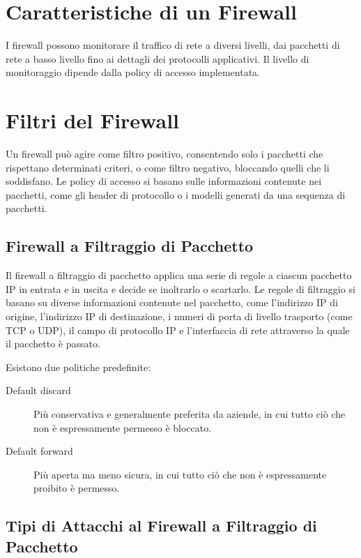 \section{Caratteristiche di un Firewall}

I firewall possono monitorare il traffico di rete a diversi livelli, dai pacchetti di rete a basso livello fino ai dettagli dei protocolli applicativi. Il livello di monitoraggio dipende dalla policy di accesso implementata.

\section{Filtri del Firewall}

Un firewall può agire come filtro positivo, consentendo solo i pacchetti che rispettano determinati criteri, o come filtro negativo, bloccando quelli che li soddisfano. Le policy di accesso si basano sulle informazioni contenute nei pacchetti, come gli header di protocollo o i modelli generati da una sequenza di pacchetti.

\subsection{Firewall a Filtraggio di Pacchetto}

Il firewall a filtraggio di pacchetto applica una serie di regole a ciascun pacchetto IP in entrata e in uscita e decide se inoltrarlo o scartarlo. Le regole di filtraggio si basano su diverse informazioni contenute nel pacchetto, come l'indirizzo IP di origine, l'indirizzo IP di destinazione, i numeri di porta di livello trasporto (come TCP o UDP), il campo di protocollo IP e l'interfaccia di rete attraverso la quale il pacchetto è passato.

Esistono due politiche predefinite:

\begin{description}
    \item[Default discard] Più conservativa e generalmente preferita da aziende, in cui tutto ciò che non è espressamente permesso è bloccato.
    
    \item[Default forward] Più aperta ma meno sicura, in cui tutto ciò che non è espressamente proibito è permesso.
\end{description}

\subsection{Tipi di Attacchi al Firewall a Filtraggio di Pacchetto}

